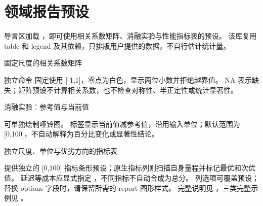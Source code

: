 \section{领域报告预设}
导言区加载 ，即可使用相关系数矩阵、消融实验与性能指标表的预设。
该库复用 table 和 legend 及其依赖，只排版用户提供的数据，不自行估计统计量。
\begin{example}[text and listing,sidebyside=false]{固定尺度的相关系数矩阵}
\begin{center}
\begin{gradtable}[align=c,header align=c,style=correlation]
\end{gradtable}
\end{center}
\end{example}
独立命令  固定使用 [-1,1]，零点为白色，显示两位小数并拒绝越界值。
NA 表示缺失；矩阵预设不计算相关系数，也不检查对称性、半正定性或统计显著性。
\begin{example}[text and listing,sidebyside=false]{消融实验：参考值与当前值}
\begin{center}
\begin{gradtable}[align=c,header align=c,style=ablation]
\end{gradtable}
\end{center}
\end{example}
 可单独绘制哑铃图。
标签显示当前值减参考值，沿用输入单位；默认范围为 [0,100]，不自动解释为百分比变化或显著性结论。
\begin{example}[text and listing,sidebyside=false]{独立尺度、单位与优劣方向的指标表}
\begin{center}
\begin{gradtable}[align=c,header align=c,style=metrics,width=\linewidth]
\end{gradtable}
\end{center}
\end{example}
 提供独立的 [0,100] 指标条形预设；原生指标列则扫描自身量程并标记最优和次优值。
延迟等成本应显式指定 ，不同指标不自动合成为总分。
列选项可覆盖预设；替换 options 字段时，请保留所需的 report 图形样式。
完整说明见 ，三类完整示例见 。
